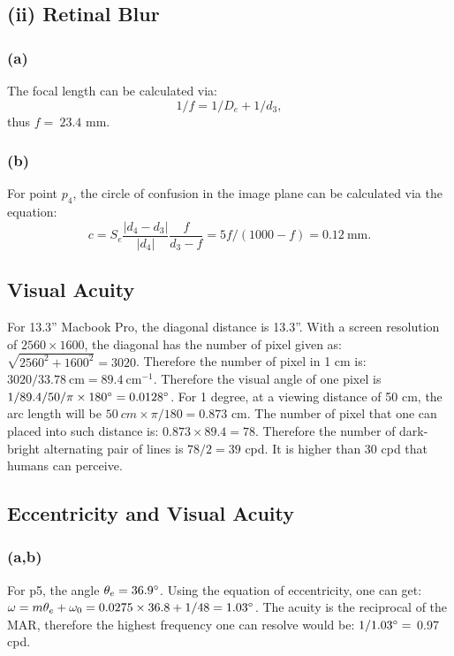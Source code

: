 \documentclass[11pt]{article}
\begin{document}
\subsection*{(ii) Retinal Blur}
\subsubsection*{(a)}
The focal length can be calculated via:
\begin{equation}
    1/f = 1/D_e + 1/d_3,
\end{equation}
thus $f=\ 23.4$ mm. 
\subsubsection*{(b)}
For point $p_4$, the circle of confusion in the image plane can be calculated via the equation:
\begin{equation}
    c = S_e\frac{|d_4-d_3|}{|d_4|}\frac{f}{d_3-f} = 5f/(1000-f) = 0.12\ \text{mm}.
\end{equation}

\subsection*{Visual Acuity}
For 13.3'' Macbook Pro, the diagonal distance is 13.3''. With a screen resolution of $2560\times1600$, the diagonal has the number of pixel given as: $\sqrt{2560^2+1600^2}=3020$. Therefore the number of pixel in 1 cm is: $3020/33.78\ \text{cm} = 89.4\ \text{cm}^{-1}$. Therefore the visual angle of one pixel is $1/89.4/50/\pi\times180\degree = 0.0128\degree$. For 1 degree, at a viewing distance of 50 cm, the arc length will be $50\ cm \times \pi/180 = 0.873$ cm. The number of pixel that one can placed into such distance is: $0.873\times89.4 = 78$. Therefore the number of dark-bright alternating pair of lines is $78/2=39$ cpd. It is higher than 30 cpd that humans can perceive. 

\subsection*{Eccentricity and Visual Acuity}
\subsubsection*{(a,b)}
For p5, the angle $\theta_e=36.9\degree$. Using the equation of eccentricity, one can get: $\omega=m\theta_e+\omega_0 = 0.0275\times36.8+1/48 = 1.03\degree $. The acuity is the reciprocal of the MAR, therefore the highest frequency one can resolve would be: $1/1.03\degree=$ 0.97 cpd. 
\end{document}
